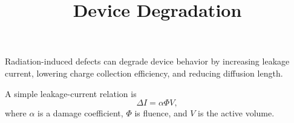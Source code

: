 \documentclass[11pt]{article}
\title{Device Degradation}
\begin{document}
\maketitle

Radiation-induced defects can degrade device behavior by increasing leakage current, lowering charge collection efficiency, and reducing diffusion length.

A simple leakage-current relation is
\[
\Delta I = \alpha \Phi V,
\]
where $\alpha$ is a damage coefficient, $\Phi$ is fluence, and $V$ is the active volume.
\end{document}
